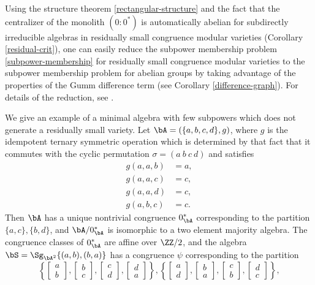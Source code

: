 \begin{rem} Using the structure theorem \ref{rectangular-structure} and the fact that the centralizer of the monolith $(0:0^*)$ is automatically abelian for subdirectly irreducible algebras in residually small congruence modular varieties (Corollary \ref{residual-crit}), one can easily reduce the subpower membership problem \ref{subpower-membership} for residually small congruence modular varieties to the subpower membership problem for abelian groups by taking advantage of the properties of the Gumm difference term (see Corollary \ref{difference-graph}). For details of the reduction, see \cite{subpower-residually-small}.
\end{rem}

\begin{ex} We give an example of a minimal algebra with few subpowers which does not generate a residually small variety. Let $\bA = (\{a,b,c,d\}, g)$, where $g$ is the idempotent ternary symmetric operation which is determined by that fact that it commutes with the cyclic permutation $\sigma = (a\ b\ c\ d)$ and satisfies
\begin{align*}
g(a,a,b) &= a,\\
g(a,a,c) &= c,\\
g(a,a,d) &= c,\\
g(a,b,c) &= c.%
\end{align*}
Then $\bA$ has a unique nontrivial congruence $0^*_\bA$ corresponding to the partition $\{a,c\},\{b,d\}$, and $\bA/0^*_\bA$ is isomorphic to a two element majority algebra. The congruence classes of $0^*_\bA$ are affine over $\ZZ/2$, and the algebra $\bS = \Sg_{\bA^2}\{(a,b),(b,a)\}$ has a congruence $\psi$ corresponding to the partition
\[
\left\{\begin{bmatrix} a\\ b\end{bmatrix},\begin{bmatrix} b\\ c\end{bmatrix},\begin{bmatrix} c\\ d\end{bmatrix}, \begin{bmatrix} d\\ a\end{bmatrix}\right\}, \left\{\begin{bmatrix} a\\ d\end{bmatrix},\begin{bmatrix} b\\ a\end{bmatrix},\begin{bmatrix} c\\ b\end{bmatrix}, \begin{bmatrix} d\\ c\end{bmatrix}\right\},
\]
\end{ex}
